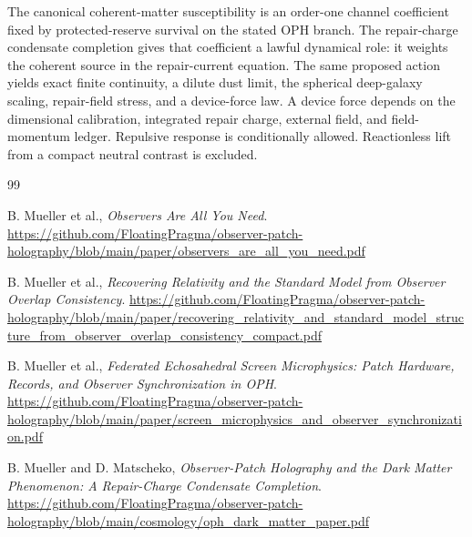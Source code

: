\documentclass[11pt]{article}
\numberwithin{equation}{section}
\theoremstyle{remark}
\begin{document}
The canonical coherent-matter susceptibility is an order-one channel
coefficient fixed by protected-reserve survival on the stated OPH branch. The
repair-charge condensate completion gives that coefficient a lawful dynamical
role: it weights the coherent source in the repair-current equation. The same
proposed action yields exact finite continuity, a dilute dust limit, the
spherical deep-galaxy scaling, repair-field stress, and a device-force law.
A device force depends on the dimensional calibration, integrated repair
charge, external field, and field-momentum ledger. Repulsive response is
conditionally allowed. Reactionless lift from a compact neutral contrast is
excluded.

\begin{thebibliography}{99}

B. Mueller et al.,
\emph{Observers Are All You Need}.
\url{https://github.com/FloatingPragma/observer-patch-holography/blob/main/paper/observers_are_all_you_need.pdf}

B. Mueller et al.,
\emph{Recovering Relativity and the Standard Model from Observer Overlap Consistency}.
\url{https://github.com/FloatingPragma/observer-patch-holography/blob/main/paper/recovering_relativity_and_standard_model_structure_from_observer_overlap_consistency_compact.pdf}

B. Mueller et al.,
\emph{Federated Echosahedral Screen Microphysics: Patch Hardware, Records, and Observer Synchronization in OPH}.
\url{https://github.com/FloatingPragma/observer-patch-holography/blob/main/paper/screen_microphysics_and_observer_synchronization.pdf}

B. Mueller and D. Matscheko,
\emph{Observer-Patch Holography and the Dark Matter Phenomenon: A Repair-Charge Condensate Completion}.
\url{https://github.com/FloatingPragma/observer-patch-holography/blob/main/cosmology/oph_dark_matter_paper.pdf}

\end{thebibliography}
\end{document}

